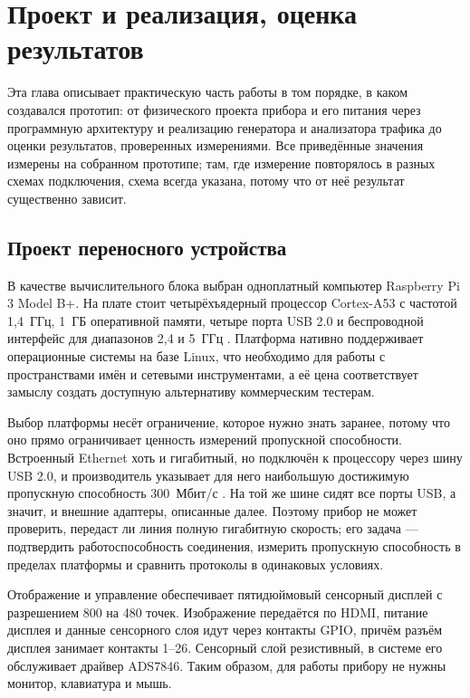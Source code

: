 \chapter{Проект и реализация, оценка результатов}
\label{sec:realizace}

Эта глава описывает практическую часть работы в том порядке, в каком создавался прототип: от физического проекта прибора и его питания через программную архитектуру и реализацию генератора и анализатора трафика до оценки результатов, проверенных измерениями. Все приведённые значения измерены на собранном прототипе; там, где измерение повторялось в разных схемах подключения, схема всегда указана, потому что от неё результат существенно зависит.

\section{Проект переносного устройства}
\label{sec:navrh_zarizeni}

В качестве вычислительного блока выбран одноплатный компьютер Raspberry Pi 3 Model B+. На плате стоит четырёхъядерный процессор Cortex-A53 с частотой 1,4~ГГц, 1~ГБ оперативной памяти, четыре порта USB 2.0 и беспроводной интерфейс для диапазонов 2,4 и 5~ГГц \cite{rpi3bplus}. Платформа нативно поддерживает операционные системы на базе Linux, что необходимо для работы с пространствами имён и сетевыми инструментами, а её цена соответствует замыслу создать доступную альтернативу коммерческим тестерам.

Выбор платформы несёт ограничение, которое нужно знать заранее, потому что оно прямо ограничивает ценность измерений пропускной способности. Встроенный Ethernet хоть и гигабитный, но подключён к процессору через шину USB 2.0, и производитель указывает для него наибольшую достижимую пропускную способность 300~Мбит/с \cite{rpi3bplus}. На той же шине сидят все порты USB, а значит, и внешние адаптеры, описанные далее. Поэтому прибор не может проверить, передаст ли линия полную гигабитную скорость; его задача — подтвердить работоспособность соединения, измерить пропускную способность в пределах платформы и сравнить протоколы в одинаковых условиях.

Отображение и управление обеспечивает пятидюймовый сенсорный дисплей с разрешением 800 на 480 точек. Изображение передаётся по HDMI, питание дисплея и данные сенсорного слоя идут через контакты GPIO, причём разъём дисплея занимает контакты 1--26. Сенсорный слой резистивный, в системе его обслуживает драйвер ADS7846. Таким образом, для работы прибору не нужны монитор, клавиатура и мышь.

